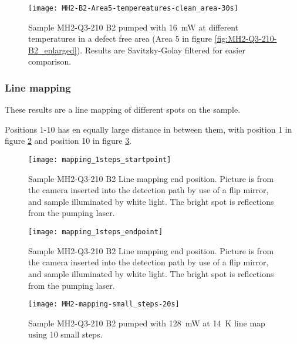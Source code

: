 \begin{figure}[H]
\centering
\texttt{[image: MH2-B2-Area5-tempereatures-clean\_area-30s]}
\caption[MH2-Q3-210 at area 5 with different temperatures]{Sample MH2-Q3-210 B2 pumped with 16~mW at different temperatures in a defect free area (Area 5 in figure \ref{fig:MH2-Q3-210-B2_enlarged}). Results are Savitzky-Golay filtered for easier comparison.}
\label{fig:MH2-B2-Area5-tempereatures-clean_area-30s}%
\end{figure}







\subsubsection{Line mapping}

These results are a line mapping of different spots on the sample.

Positions 1-10 has en equally large distance in between them, with position 1 in figure \ref{fig:mapping_1steps_startpoint} and position 10 in figure \ref{fig:mapping_1steps_endpoint}.

\begin{figure}[H]
\centering
\texttt{[image: mapping\_1steps\_startpoint]}
\caption[MH2-Q3-210 line mapping start position]{Sample MH2-Q3-210 B2 Line mapping end position. Picture is from the camera inserted into the detection path by use of a flip mirror, and sample illuminated by white light. The bright spot is reflections from the pumping laser.}
\label{fig:mapping_1steps_startpoint}%
\end{figure}


\begin{figure}[H]
\centering
\texttt{[image: mapping\_1steps\_endpoint]}
\caption[MH2-Q3-210 line mapping end position]{Sample MH2-Q3-210 B2 Line mapping end position. Picture is from the camera inserted into the detection path by use of a flip mirror, and sample illuminated by white light. The bright spot is reflections from the pumping laser.}
\label{fig:mapping_1steps_endpoint}%
\end{figure}

\begin{figure}[H]
\centering
\texttt{[image: MH2-mapping-small\_steps-20s]}
\caption[MH2-Q3-210 line mapping]{Sample MH2-Q3-210 B2 pumped with 128~mW at 14~K line map using 10 small steps.}
\label{fig:MH2-mapping-small_steps-20s}%
\end{figure}



